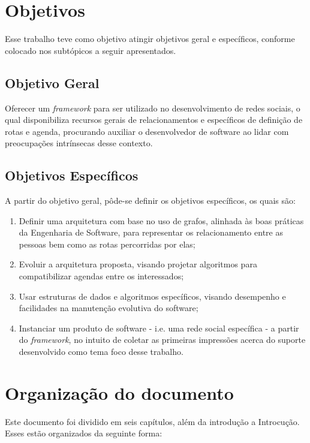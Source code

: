 \section{Objetivos}

Esse trabalho teve como objetivo atingir objetivos geral e específicos, conforme colocado nos subtópicos a seguir apresentados.

\subsection{Objetivo Geral}

Oferecer um \textit{framework} para ser utilizado no desenvolvimento de redes sociais, o qual disponibiliza recursos gerais de relacionamentos e específicos de definição de rotas e agenda, procurando auxiliar o desenvolvedor de software ao lidar com preocupações intrínsecas desse contexto.

\subsection{Objetivos Específicos}

A partir do objetivo geral, pôde-se definir os objetivos específicos, os quais são:

\begin{enumerate}
	\item Definir uma arquitetura com base no uso de grafos, alinhada às boas práticas da Engenharia de Software, para representar os relacionamento entre as pessoas bem como as rotas percorridas por elas;
	\item Evoluir a arquitetura proposta, visando projetar algoritmos para compatibilizar agendas entre os interessados;
	\item Usar estruturas de dados e algoritmos específicos, visando desempenho e facilidades na manutenção evolutiva do software;
	\item Instanciar um produto de software - i.e. uma rede social específica - a partir do \textit{framework}, no intuito de coletar as primeiras impressões acerca do suporte desenvolvido como tema foco desse trabalho.
\end{enumerate}

\section{Organização do documento}

Este documento foi dividido em seis capítulos, além da introdução a Introcução. Esses estão organizados da seguinte forma:

